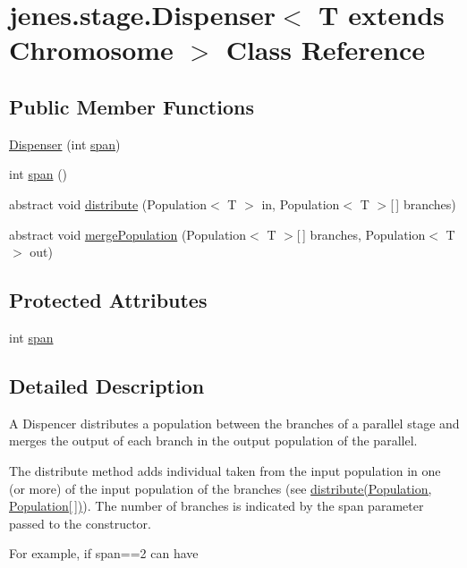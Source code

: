 \hypertarget{classjenes_1_1stage_1_1_dispenser_3_01_t_01extends_01_chromosome_01_4}{
\section{jenes.stage.Dispenser$<$ T extends Chromosome $>$ Class Reference}
\label{classjenes_1_1stage_1_1_dispenser_3_01_t_01extends_01_chromosome_01_4}
}
\subsection*{Public Member Functions}
\begin{CompactItemize}
\item 
\hyperlink{classjenes_1_1stage_1_1_dispenser_3_01_t_01extends_01_chromosome_01_4_8972dc3bcea956122cc623784a833bcf}{Dispenser} (int \hyperlink{classjenes_1_1stage_1_1_dispenser_3_01_t_01extends_01_chromosome_01_4_8f9bc0997e0536729db0c55bc9e240a5}{span})
\item 
int \hyperlink{classjenes_1_1stage_1_1_dispenser_3_01_t_01extends_01_chromosome_01_4_6ece937f3d7564424f6367e96e1b21c7}{span} ()
\item 
abstract void \hyperlink{classjenes_1_1stage_1_1_dispenser_3_01_t_01extends_01_chromosome_01_4_e9eb1e3be8a72e70e2bc75c53f31265b}{distribute} (Population$<$ T $>$ in, Population$<$ T $>$\mbox{[}$\,$\mbox{]} branches)
\item 
abstract void \hyperlink{classjenes_1_1stage_1_1_dispenser_3_01_t_01extends_01_chromosome_01_4_e35fcd8e2c1ecf6c9069107122b8a894}{mergePopulation} (Population$<$ T $>$\mbox{[}$\,$\mbox{]} branches, Population$<$ T $>$ out)
\end{CompactItemize}
\subsection*{Protected Attributes}
\begin{CompactItemize}
\item 
int \hyperlink{classjenes_1_1stage_1_1_dispenser_3_01_t_01extends_01_chromosome_01_4_8f9bc0997e0536729db0c55bc9e240a5}{span}
\end{CompactItemize}


\subsection{Detailed Description}
A Dispencer distributes a population between the branches of a parallel stage and merges the output of each branch in the output population of the parallel.\par
 \par
 The distribute method adds individual taken from the input population in one (or more) of the input population of the branches (see \hyperlink{}{distribute(Population, Population\mbox{[}$\,$\mbox{]})}). The number of branches is indicated by the span parameter passed to the constructor.\par
 \par
 For example, if span==2 can have\par
 

